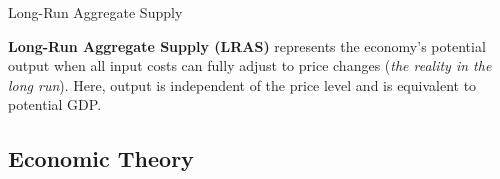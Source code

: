 \documentclass[10pt]{article}
\begin{document}
    \begin{core}[label=core:lras]{Long-Run Aggregate Supply}

      \textbf{Long-Run Aggregate Supply (LRAS)} represents the economy's potential output when all input costs can fully adjust to price changes (\textit{the reality in the long run}). Here, output is independent of the price level and is equivalent to potential GDP.


    \end{core}

  \subsection{Economic Theory}
\end{document}
